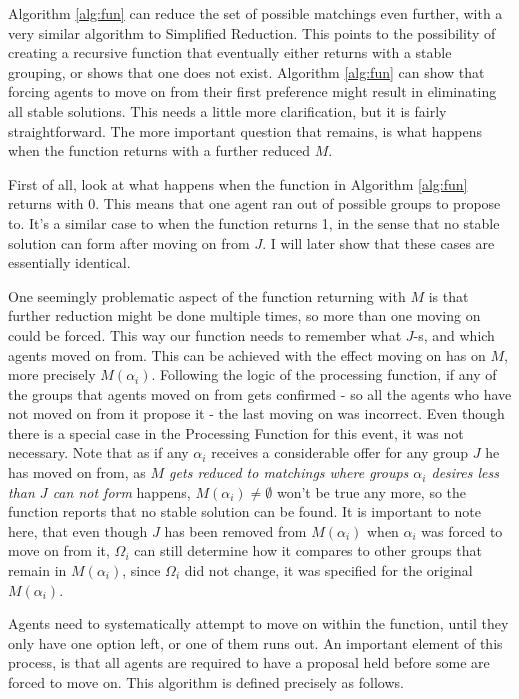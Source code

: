 \documentclass{elsarticle}
\begin{document}
Algorithm \ref{alg:fun} can reduce the set of possible matchings even further, with a very similar algorithm to Simplified Reduction. This points to the possibility of creating a recursive function that eventually either returns with a stable grouping, or shows that one does not exist. Algorithm \ref{alg:fun} can show that forcing agents to move on from their first preference might result in eliminating all stable solutions. This needs a little more clarification, but it is fairly straightforward. The more important question that remains, is what happens when the function returns with a further reduced $M$.

First of all, look at what happens when the function in Algorithm \ref{alg:fun} returns with 0. This means that one agent ran out of possible groups to propose to. It's a similar case to when the function returns 1, in the sense that no stable solution can form after moving on from $J$. I will later show that these cases are essentially identical.

One seemingly problematic aspect of the function returning with $M$ is that further reduction might be done multiple times, so more than one moving on could be forced. This way our function needs to remember what $J$-s, and which agents moved on from. This can be achieved with the effect moving on has on $M$, more precisely $M(\alpha_i)$. Following the logic of the processing function, if any of the groups that agents moved on from gets confirmed - so all the agents who have not moved on from it propose it - the last moving on was incorrect. Even though there is a special case in the Processing Function for this event, it was not necessary. Note that as if any $\alpha_i$ receives a considerable offer for any group $J$ he has moved on from, as \textit{$M$ gets reduced to matchings where groups $\alpha_i$ desires less than $J$ can not form} happens, $M(\alpha_i) \neq \emptyset$ won't be true any more, so the function reports that no stable solution can be found. It is important to note here, that even though $J$ has been removed from $M(\alpha_i)$ when $\alpha_i$ was forced to move on from it, $\Omega_i$ can still determine how it compares to other groups that remain in $M(\alpha_i)$, since $\Omega_i$ did not change, it was specified for the original $M(\alpha_i)$.

Agents need to systematically attempt to move on within the function, until they only have one option left, or one of them runs out. An important element of this process, is that all agents are required to have a proposal held before some are forced to move on. This algorithm is defined precisely as follows.
\end{document}
